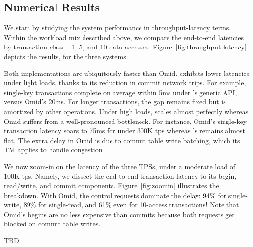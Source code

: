 \subsection{Numerical Results} 

We start by studying the system performance in throughput-latency terms. 
Within the workload mix described above, we compare the end-to-end latencies by transaction class -- 
1, 5, and 10 data accesses. Figure~\ref{fig:throughput-latency} depicts the results, for the three systems. 

Both {\sys\/} implementations are ubiquitously faster than Omid. {\sys\/} exhibits lower latencies under light loads, 
thanks to its reduction in commit network trips. For example, single-key transactions complete on average within 
5ms under {\sys}'s generic API, versus Omid's 20ms. For longer transactions, the gap remains fixed but is amortized 
by other operations. Under high loads, {\sys\/} scales almost perfectly whereas Omid suffers from a well-pronounced 
bottleneck. For instance, Omid's single-key transaction latency soars to 75ms for under 300K tps whereas
{\sys}'s remains almost flat. The extra delay in Omid is due to commit table write batching, which its TM applies 
to handle congestion~\cite{Omid2017}. %

We now zoom-in on the latency of the three TPSs, under a moderate load of 100K tps. Namely, we dissect the end-to-end 
transaction latency to its begin, read/write, and commit components. Figure~\ref{fig:zoomin} illustrates the breakdown. 
With Omid, the control requests dominate the delay: 94\% for single-write, 89\% for single-read, and 61\%
even for 10-access transactions! Note that Omid's begins are no less expensive than commits because both 
requests get blocked on commit table writes. 

TBD 






